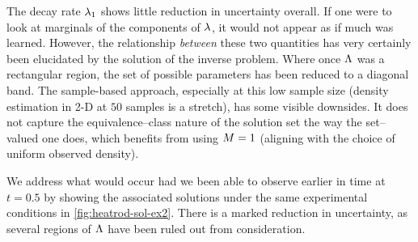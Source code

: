 The decay rate $\lambda_1$ shows little reduction in uncertainty overall.
If one were to look at marginals of the components of $\lambda$, it would not appear as if much was learned.
However, the relationship \emph{between} these two quantities has very certainly been elucidated by the solution of the inverse problem.
Where once ${\Lambda}$ was a rectangular region, the set of possible parameters has been reduced to a diagonal band.
The sample-based approach, especially at this low sample size (density estimation in 2-D at $50$ samples is a stretch), has some visible downsides.
It does not capture the equivalence--class nature of the solution set the way the set--valued one does, which benefits from using $M=1$ (aligning with the choice of uniform observed density).


We address what would occur had we been able to observe earlier in time at $t=0.5$ by showing the associated solutions under the same experimental conditions in \ref{fig:heatrod-sol-ex2}.
There is a marked reduction in uncertainty, as several regions of ${\Lambda}$ have been ruled out from consideration.


